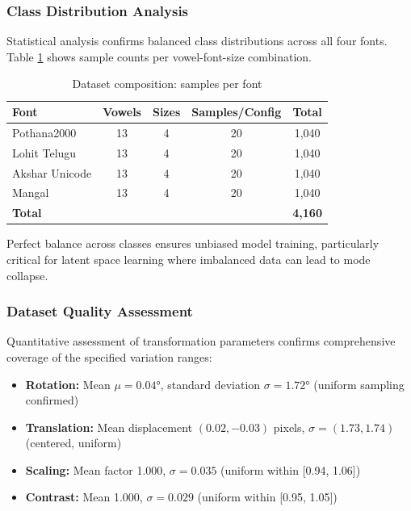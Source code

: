 \documentclass[review]{elsarticle}
\begin{document}
\subsubsection{Class Distribution Analysis}

Statistical analysis confirms balanced class distributions across all four fonts. Table \ref{tab:distribution} shows sample counts per vowel-font-size combination.

\begin{table}[htbp]
\centering
\caption{Dataset composition: samples per font}
\label{tab:distribution}
\begin{tabular}{lcccc}
\toprule
\textbf{Font} & \textbf{Vowels} & \textbf{Sizes} & \textbf{Samples/Config} & \textbf{Total} \\
\midrule
Pothana2000 & 13 & 4 & 20 & 1,040 \\
Lohit Telugu & 13 & 4 & 20 & 1,040 \\
Akshar Unicode & 13 & 4 & 20 & 1,040 \\
Mangal & 13 & 4 & 20 & 1,040 \\
\midrule
\textbf{Total} & & & & \textbf{4,160} \\
\bottomrule
\end{tabular}
\end{table}

Perfect balance across classes ensures unbiased model training, particularly critical for latent space learning where imbalanced data can lead to mode collapse.

\subsubsection{Dataset Quality Assessment}

Quantitative assessment of transformation parameters confirms comprehensive coverage of the specified variation ranges:

\begin{itemize}
\item \textbf{Rotation:} Mean $\mu = 0.04°$, standard deviation $\sigma = 1.72°$ (uniform sampling confirmed)
\item \textbf{Translation:} Mean displacement $(0.02, -0.03)$ pixels, $\sigma = (1.73, 1.74)$ (centered, uniform)
\item \textbf{Scaling:} Mean factor 1.000, $\sigma = 0.035$ (uniform within [0.94, 1.06])
\item \textbf{Contrast:} Mean 1.000, $\sigma = 0.029$ (uniform within [0.95, 1.05])
\end{itemize}
\end{document}
